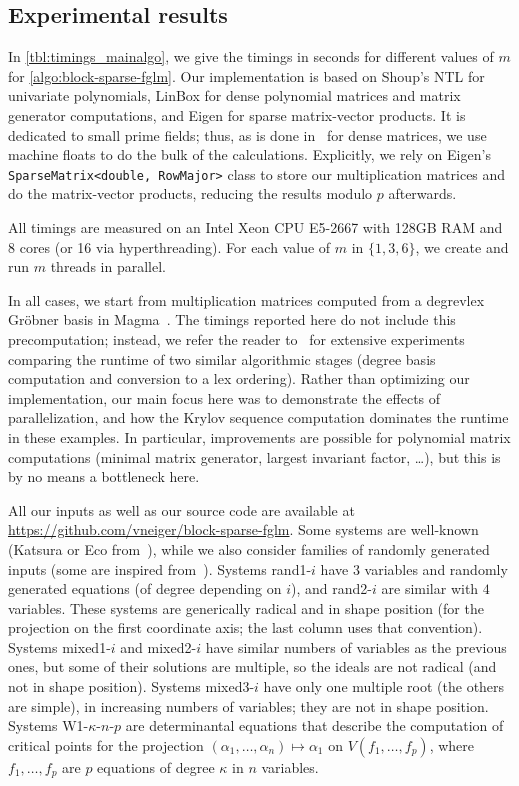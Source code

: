 \documentclass[final,1p,times,authoryear]{elsarticle}
\begin{document}

\subsection{Experimental results}\label{section:ex}

In \cref{tbl:timings_mainalgo}, we give the timings in seconds for
different values of $m$ for \cref{algo:block-sparse-fglm}.  Our
implementation is based on Shoup's NTL for univariate polynomials, LinBox
for dense polynomial matrices and matrix generator
computations, and Eigen for sparse matrix-vector
products. It is dedicated to small prime fields; thus,
as is done in~\citep{fflas-ffpack} for dense matrices, we use machine
floats to do the bulk of the calculations. Explicitly, we rely on
Eigen's {\tt SparseMatrix<double, RowMajor>} class to store our
multiplication matrices and do the matrix-vector products, reducing
the results modulo $p$ afterwards.

All timings are measured on an Intel Xeon CPU E5-2667 with 128GB RAM
and 8 cores (or 16 via hyperthreading). For each value of
$m$ in $\{1,3,6\}$, we create and run $m$ threads in parallel.

In all cases, we start from multiplication matrices computed from a
{degrevlex} Gr\"obner basis in Magma~\citep{BoCaPl97}. The timings
reported here do not include this precomputation; instead, we refer
the reader to~\citep{FaMo17} for extensive experiments comparing the
runtime of two similar algorithmic stages (degree basis computation and
conversion to a lex ordering).  Rather than optimizing our
implementation, our main focus here was to demonstrate the effects of
parallelization, and how the Krylov sequence computation dominates the
runtime in these examples. In particular, improvements are possible for
polynomial matrix computations (minimal matrix generator, largest invariant
factor, \dots), but this is by no means a bottleneck here.

All our inputs as well as our source code are available at
\url{https://github.com/vneiger/block-sparse-fglm}.
Some systems
are well-known (Katsura or Eco from~\citep{Morgan88}), while we also
consider families of randomly generated inputs (some are
inspired from~\citep{FaMo17}). Systems rand1-$i$ have $3$ variables and
randomly generated equations (of degree depending on $i$), and
rand2-$i$ are similar with $4$ variables. These systems are
generically radical and in shape position (for the projection on the
first coordinate axis; the last column uses that
convention). Systems mixed1-$i$ and mixed2-$i$ have similar numbers of
variables as the previous ones, but some of their solutions are
multiple, so the ideals are not radical (and not in shape
position). Systems mixed3-$i$ have only one multiple root (the others
are simple), in increasing numbers of variables; they are not in shape
position. Systems W1-$\kappa$-$n$-$p$ are determinantal equations that
describe the computation of critical points for the projection $
(\alpha_1,\dots,\alpha_n) \mapsto \alpha_1$ on $V(f_1,\dots,f_p)$,
where $f_1,\dots,f_p$ are $p$ equations of degree $\kappa$ in $n$
variables.
\end{document}

